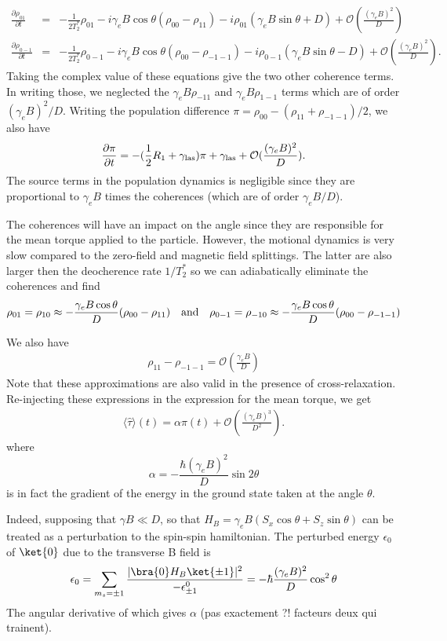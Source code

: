 \documentclass[preprintnumbers,amsmath,amssymb]{revtex4}
\newcommand{\be}{\begin{equation}}
\newcommand{\ee}{\end{equation}}
\newcommand{\bea}{\begin{eqnarray}}
\newcommand{\eea}{\end{eqnarray}}
\begin{document}
\bea
\frac{\partial \rho_{01}}{\partial t}&=&-\frac{1}{2T_2^*} \rho_{01}-i\gamma_e B\cos\theta(\rho_{00}-\rho_{11})-i\rho_{01}(\gamma_e B \sin\theta +D)+\mathcal{O}(\frac{(\gamma_e B)^2}{D})\\
\frac{\partial \rho_{0-1}}{\partial t}&=&-\frac{1}{2T_2^*} \rho_{0-1}-i\gamma_e B\cos\theta(\rho_{00}-\rho_{-1-1})-i\rho_{0-1}(\gamma_e B \sin\theta -D)+\mathcal{O}(\frac{(\gamma_e B)^2}{D}).
\eea
Taking the complex value of these equations give the two other coherence terms. 
In writing those, we neglected the $\gamma_e B\rho_{-11}$ and $\gamma_e B \rho_{1-1}$ terms which are of order $(\gamma_e B)^2/D$. 
Writing the population difference $\pi=\rho_{00}-(\rho_{11}+\rho_{-1-1})/2$, we also have 
\bea
\frac{\partial \pi}{\partial t}=-(\frac{1}{2}R_1+\gamma_{\rm las})\pi+\gamma_{\rm las}+\mathcal{O}(\frac{(\gamma_e B)^2}{D}).
\eea
The source terms in the population dynamics is negligible since they are proportional to $\gamma_e B$ times the coherences (which are of order $\gamma_e B /D$).

The coherences will have an impact on the angle since they are responsible for the mean torque applied to the particle. 
However, the motional dynamics is very slow compared to the zero-field and magnetic field splittings. The latter are also larger then the deocherence rate $1/T_2^*$ so we can adiabatically eliminate the coherences and find 
\bea
\rho_{01}=\rho_{10}\approx-\frac{\gamma_e B \cos\theta}{D}(\rho_{00}-\rho_{11}) \quad {\rm and} \quad \rho_{0-1}=\rho_{-10}\approx-\frac{\gamma_e B \cos\theta}{D}(\rho_{00}-\rho_{-1-1})
\eea


We also have 
\bea
\rho_{11}-\rho_{-1-1}=\mathcal{O}(\frac{\gamma_e B}{D})
\eea
Note that these approximations are also valid in the presence of cross-relaxation. Re-injecting these expressions in the expression for the mean torque, we get 
\bea
\langle \hat \tau \rangle(t) = \alpha   \pi(t) +  \mathcal{O}(\frac{(\gamma_e B)^3}{D^2}).
\eea
where 
\be
 \alpha=-\frac{\hbar(\gamma_e B)^2}{D}\sin2\theta
\ee
is in fact the gradient of the energy in the ground state taken at the angle $\theta$. 

Indeed, supposing that $\gamma B \ll D$, so that $H_{B}= \gamma_e B  ( S_x \cos\theta + S_z \sin\theta)$ can be treated as a perturbation to the spin-spin hamiltonian. 
The perturbed energy $\epsilon_0$ of $\ket{0}$ due to the transverse B field is 
$$ \epsilon_0=\sum_{m_s=\pm 1}\frac{ |\bra{0} H_B \ket{\pm 1}|^2}{-\epsilon^0_{\pm 1}}=-\hbar\frac{(\gamma_e B)^2 }{D} \cos^2\theta
$$
The angular derivative of which gives $\alpha$ (pas exactement ?! facteurs deux qui trainent).
\end{document}
